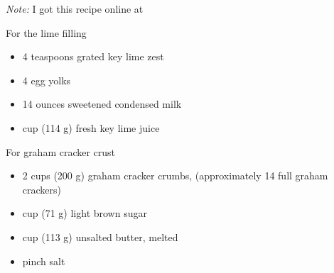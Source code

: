 
\textit{Note:} I got this recipe online at 
\ingredients

For the lime filling
\begin{itemize}
    \item 4 teaspoons grated key lime zest
    \item 4 egg yolks
    \item 14 ounces sweetened condensed milk
    \item {} cup (114 g) fresh key lime juice
\end{itemize}

For graham cracker crust
\begin{itemize}
    \item 2 cups (200 g) graham cracker crumbs, (approximately 14 full graham crackers)
    \item {} cup (71 g) light brown sugar
    \item {} cup (113 g) unsalted butter, melted
    \item pinch salt
\end{itemize}


